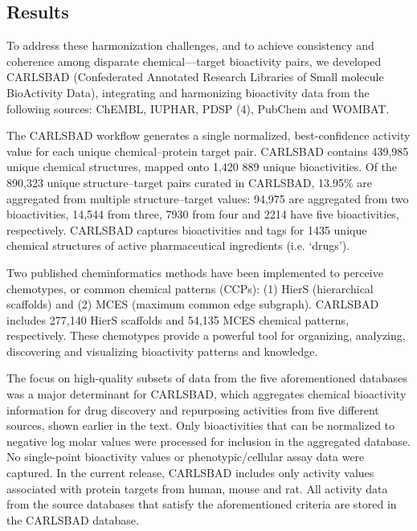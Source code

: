 \subsection{Results}

To address these harmonization challenges, and to achieve consistency and coherence among disparate chemical—target bioactivity pairs, we developed CARLSBAD (Confederated Annotated Research Libraries of Small molecule BioActivity Data), integrating and harmonizing bioactivity data from the following sources: ChEMBL\cite{Gaulton2017-gp}, IUPHAR\cite{Harding2018-ut}, PDSP\cite{Roth2000-bh} (4), PubChem\cite{Kim2021-dv} and WOMBAT\cite{Olah2005-zd}.

The CARLSBAD workflow generates a single normalized, best-confidence activity value for each unique chemical–protein target pair. CARLSBAD contains 439,985 unique chemical structures, mapped onto 1,420 889 unique bioactivities. Of the 890,323 unique structure–target pairs curated in CARLSBAD, 13.95\% are aggregated from multiple structure–target values: 94,975 are aggregated from two bioactivities, 14,544 from three, 7930 from four and 2214 have five bioactivities, respectively.  CARLSBAD captures bioactivities and tags for 1435 unique chemical structures of active pharmaceutical ingredients (i.e. ‘drugs’). 

Two published cheminformatics methods have been implemented to perceive chemotypes, or common chemical patterns (CCPs): (1) HierS (hierarchical scaffolds) and (2) MCES (maximum common edge subgraph). CARLSBAD includes 277,140 HierS scaffolds and 54,135 MCES chemical patterns, respectively. These chemotypes provide a powerful tool for organizing, analyzing, discovering and visualizing bioactivity patterns and knowledge.

The focus on high-quality subsets of data from the five aforementioned databases was a major determinant for CARLSBAD, which aggregates chemical bioactivity information for drug discovery and repurposing activities from five different sources, shown earlier in the text. Only bioactivities that can be normalized to negative log molar values were processed for inclusion in the aggregated database. No single-point bioactivity values or phenotypic/cellular assay data were captured. In the current release, CARLSBAD includes only activity values associated with protein targets from human, mouse and rat. All activity data from the source databases that satisfy the aforementioned criteria are stored in the CARLSBAD database.

